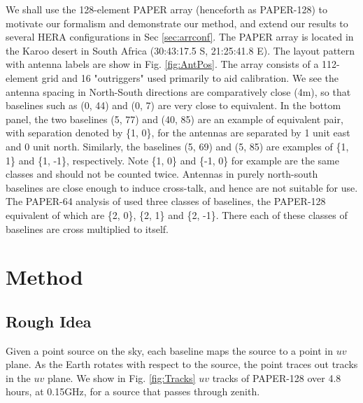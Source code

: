 \documentclass[twocolumn,apj,numberedappendix]{emulateapj}
\renewcommand\[{\begin{equation}}
\renewcommand\]{\end{equation}}
\begin{document}
We shall use the 128-element PAPER array (henceforth as PAPER-128) to motivate our formalism and demonstrate our method, and extend our results to several HERA configurations in Sec \ref{sec:arrconf}. 
The PAPER array is located in the Karoo desert in South Africa (30:43:17.5
S, 21:25:41.8 E). The layout pattern with antenna labels are show
in Fig. \ref{fig:AntPos}. The array consists of a 112-element grid and 16 "outriggers" used primarily to aid calibration. We see the antenna spacing in North-South
directions are comparatively close (4m), so that baselines such as
(0, 44) and (0, 7) are very close to equivalent. In the bottom panel, the two baselines (5, 77) and (40, 85) are an example of equivalent pair, with separation denoted by \{1, 0\}, for the
antennas are separated by 1 unit east and 0 unit north. Similarly,
the baselines (5, 69) and (5, 85) are examples
of \{1, 1\} and \{1, -1\}, respectively.
Note \{1, 0\} and \{-1, 0\} for example are the same classes and should
not be counted twice. Antennas in purely north-south baselines
are close enough to induce cross-talk, and hence are not suitable
for use. The PAPER-64 analysis of \cite{Ali2015} used three classes of baselines, the PAPER-128
equivalent of which are 
\{2, 0\}, \{2, 1\} and \{2, -1\}. There each of these classes
of baselines are cross multiplied to itself. 


\section{Method}

\subsection{Rough Idea}



Given a point source on the sky, each baseline maps the
source to a point in $uv$ plane. As the Earth rotates with respect to
the source, the point traces out tracks in the $uv$ plane. 
We show in Fig. \ref{fig:Tracks} $uv$ tracks of PAPER-128 over 4.8 hours, at 0.15GHz, for a source that passes through zenith. 
\end{document}
